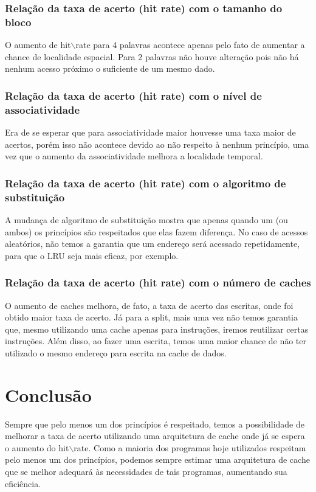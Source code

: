 \documentclass[10pt,a4paper]{article}
\begin{document}
\subsubsection{Relação da taxa de acerto (hit rate) com o tamanho do bloco}
O aumento de hit$\backslash$rate para 4 palavras acontece apenas pelo fato de aumentar a chance de localidade espacial. Para 2 palavras não houve alteração pois não há nenhum acesso próximo o suficiente de um mesmo dado.
\subsubsection{Relação da taxa de acerto (hit rate) com o nível de associatividade}
Era de se esperar que para associatividade maior houvesse uma taxa maior de acertos, porém isso não acontece devido ao não respeito à nenhum princípio, uma vez que o aumento da associatividade melhora a localidade temporal.
\subsubsection{Relação da taxa de acerto (hit rate) com o algoritmo de substituição}
A mudança de algoritmo de substituição mostra que apenas quando um (ou ambos) os princípios são respeitados que elas fazem diferença. No caso de acessos aleatórios, não temos a garantia que um endereço será acessado repetidamente, para que o LRU seja mais eficaz, por exemplo.
\subsubsection{Relação da taxa de acerto (hit rate) com o número de caches}
O aumento de caches melhora, de fato, a taxa de acerto das escritas, onde foi obtido maior taxa de acerto. Já para a split, mais uma vez não temos garantia que, mesmo utilizando uma cache apenas para instruções, iremos reutilizar certas instruções. Além disso, ao fazer uma escrita, temos uma maior chance de não ter utilizado o mesmo endereço para escrita na cache de dados.
\section{Conclusão}
Sempre que pelo menos um dos princípios é respeitado, temos a possibilidade de melhorar a taxa de acerto utilizando uma arquitetura de cache onde já se espera o aumento do hit$\backslash$rate. Como a maioria dos programas hoje utilizados respeitam pelo menos um dos princípios, podemos sempre estimar uma arquitetura de cache que se melhor adequará às necessidades de tais programas, aumentando sua eficiência.
\end{document}
